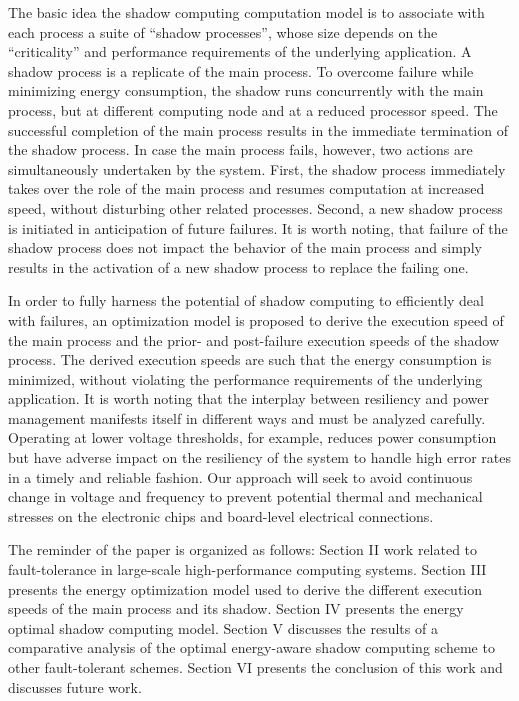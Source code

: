 The basic idea the shadow computing computation model is to associate
with each process a suite of ``shadow processes'', whose size depends on
the ``criticality'' and performance requirements of the underlying
application. A shadow process is a replicate of the main process. To
overcome failure while minimizing energy consumption, the shadow runs
concurrently with the main process, but at different computing node
and at a reduced processor speed. The successful completion of the
main process results in the immediate termination of the shadow
process. In case the main process fails, however, two actions are
simultaneously undertaken by the system. First, the shadow process
immediately takes over the role of the main process and resumes
computation at increased speed, without disturbing other related
processes. Second, a new shadow process is initiated in anticipation
of future failures. It is worth noting, that failure of the shadow
process does not impact the behavior of the main process and simply
results in the activation of a new shadow process to replace the
failing one.

In order to fully harness the potential of shadow computing to
efficiently deal with failures, an optimization model is proposed to
derive the execution speed of the main process and the prior- and
post-failure execution speeds of the shadow process. The derived
execution speeds are such that the energy consumption is minimized,
without violating the performance requirements of the underlying
application.  It is worth noting that the interplay between resiliency
and power management manifests itself in different ways and must be
analyzed carefully. Operating at lower voltage thresholds, for
example, reduces power consumption but have adverse impact on the
resiliency of the system to handle high error rates in a timely and
reliable fashion. Our approach will seek to avoid continuous change in
voltage and frequency to prevent potential thermal and mechanical
stresses on the electronic chips and board-level electrical
connections.

The reminder of the paper is organized as follows: Section II work
related to fault-tolerance in large-scale high-performance computing
systems. Section III presents the energy optimization model used to
derive the different execution speeds of the main process and its
shadow. Section IV presents the energy optimal shadow computing
model. Section V discusses the results of a comparative analysis of
the optimal energy-aware shadow computing scheme to other
fault-tolerant schemes.  Section VI presents the conclusion of this
work and discusses future work.


